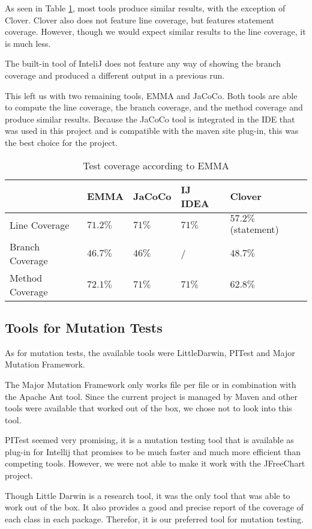\documentclass[]{article}
\begin{document}
As seen in Table \ref{testCoverageTools}, most tools produce similar results, with the exception of Clover. Clover also does not feature line coverage, but features statement coverage. However, though we would expect similar results to the line coverage, it is much less.

The built-in tool of InteliJ does not feature any way of showing the branch coverage and produced a different output in a previous run. 

This left us with two remaining tools, EMMA and JaCoCo. Both tools are able to compute the line coverage, the branch coverage, and the method coverage and produce similar results. Because the JaCoCo tool is integrated in the IDE that was used in this project and is compatible with the maven site plug-in, this was the best choice for the project. 

\begin{table}[]
	\begin{center}
		\begin{tabular}{|l||l|l|l|l|}
			\hline
			&  EMMA & JaCoCo & IJ IDEA & Clover\\ \hline\hline
			Line Coverage	& $71.2\%$ & $71\%$ & $71\%$ &  $57.2\%$ (statement)\\
			Branch Coverage	& $46.7\%$ & $46\%$ &  / & $48.7\%$\\
			Method Coverage	& $72.1\%$ & $71\%$ & $71\%$& $62.8\%$ \\ 
			\hline
		\end{tabular}
		\caption{Test coverage according to EMMA}
		\label{testCoverageTools}
	\end{center}
	
\end{table}

\subsection{Tools for Mutation Tests}

As for mutation tests, the available tools were LittleDarwin, PITest and Major Mutation Framework. 

The Major Mutation Framework only works file per file or in combination with the Apache Ant tool. Since the current project is managed by Maven and other tools were available that worked out of the box, we chose not to look into this tool. 

PITest seemed very promising, it is a mutation testing tool that is available as plug-in for Intellij that promises to be much faster and much more efficient than competing tools. However, we were not able to make it work with the JFreeChart project. 

Though Little Darwin is a research tool, it was the only tool that was able to work out of the box. It also provides a good and precise report of the coverage of each class in each package. Therefor, it is our preferred tool for mutation testing.  
\end{document}
